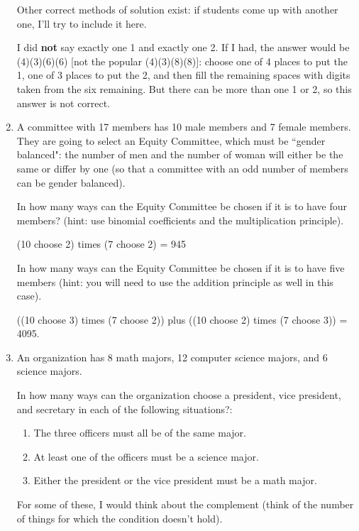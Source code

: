 \documentclass[12pt]{article}
\begin{document}
\begin{enumerate}
Other correct methods of solution exist:  if students come up with another one, I'll try to include it here.

I did {\bf not\/} say exactly one 1 and exactly one 2.  If I had, the answer would be (4)(3)(6)(6) [not the popular
(4)(3)(8)(8)]:  choose one of 4 places to put the 1, one of 3 places to put the 2, and then fill the remaining spaces with digits taken from the six remaining.  But there can be more than one 1 or 2, so this answer is not correct.

\newpage

\item  A committee with 17 members has 10 male members and 7 female members.  They are going to select an Equity Committee, which must be ``gender balanced":  the number of men and the number of woman will either be the same or differ by one (so that a committee with an odd number of members can be gender balanced).

In how many ways can the Equity Committee be chosen if it is to have four members?  (hint:  use binomial coefficients and the multiplication principle).

(10 choose 2) times (7 choose 2) = 945

In how many ways can the Equity Committee be chosen if it is to have five members (hint: you will need to use the addition principle as well in this case).

((10 choose 3) times (7 choose 2)) plus ((10 choose 2) times (7 choose 3)) = 4095.

\newpage

\item  An organization has 8 math majors, 12 computer science majors, and 6 science majors.

In how many ways can the organization choose a president, vice president, and secretary in each of the following situations?:

\begin{enumerate}
\item   The three officers must all be of the same major.

\item   At least one of the officers must be a science major.

\item  Either the president or the vice president must be a math major.

\end{enumerate}

For some of these, I would think about the complement (think of the number of things for which the condition doesn't hold).


\end{enumerate}
\end{document}
